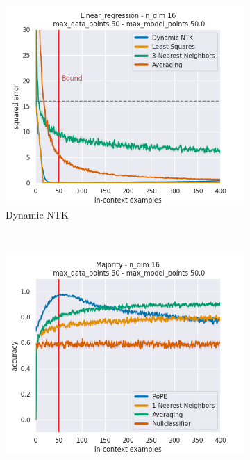 \documentclass[letterpaper]{article} %
\begin{document}
\begin{figure}[tp]
\begin{subfigure}[t]{0.32\linewidth}
    \end{subfigure}
    \begin{subfigure}[t]{0.32\linewidth}
        \includegraphics[width=\linewidth]{AnonymousSubmission/LaTeX/imgs/appendix/linear-regression/ntk.png}
        \caption{Dynamic NTK}
    \end{subfigure}
    \\
    \begin{subfigure}[t]{0.32\linewidth}
        \includegraphics[width=\linewidth]{AnonymousSubmission/LaTeX/imgs/appendix/majority/rope.png}

\end{subfigure}
\end{figure}
\end{document}
